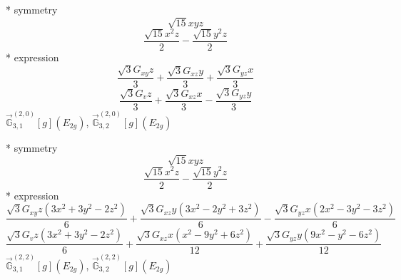 \documentclass[fleqn,8pt]{jsarticle}
\begin{document}
\noindent\quad ** symmetry
\begin{dmath*}
\sqrt{15} x y z
\end{dmath*}
\begin{dmath*}
\frac{\sqrt{15} x^{2} z}{2} - \frac{\sqrt{15} y^{2} z}{2}
\end{dmath*}
\noindent\quad ** expression
\begin{dmath*}
\frac{\sqrt{3} G_{xy} z}{3} + \frac{\sqrt{3} G_{xz} y}{3} + \frac{\sqrt{3} G_{yz} x}{3}
\end{dmath*}
\begin{dmath*}
\frac{\sqrt{3} G_{v} z}{3} + \frac{\sqrt{3} G_{xz} x}{3} - \frac{\sqrt{3} G_{yz} y}{3}
\end{dmath*}
\noindent\quad $\vec{\mathbb{G}}_{3,1}^{(2,0)}[g](E_{2g})$, $\vec{\mathbb{G}}_{3,2}^{(2,0)}[g](E_{2g})$

\noindent\quad ** symmetry
\begin{dmath*}
\sqrt{15} x y z
\end{dmath*}
\begin{dmath*}
\frac{\sqrt{15} x^{2} z}{2} - \frac{\sqrt{15} y^{2} z}{2}
\end{dmath*}
\noindent\quad ** expression
\begin{dmath*}
\frac{\sqrt{3} G_{xy} z \left(3 x^{2} + 3 y^{2} - 2 z^{2}\right)}{6} + \frac{\sqrt{3} G_{xz} y \left(3 x^{2} - 2 y^{2} + 3 z^{2}\right)}{6} - \frac{\sqrt{3} G_{yz} x \left(2 x^{2} - 3 y^{2} - 3 z^{2}\right)}{6}
\end{dmath*}
\begin{dmath*}
\frac{\sqrt{3} G_{v} z \left(3 x^{2} + 3 y^{2} - 2 z^{2}\right)}{6} + \frac{\sqrt{3} G_{xz} x \left(x^{2} - 9 y^{2} + 6 z^{2}\right)}{12} + \frac{\sqrt{3} G_{yz} y \left(9 x^{2} - y^{2} - 6 z^{2}\right)}{12}
\end{dmath*}
\noindent\quad $\vec{\mathbb{G}}_{3,1}^{(2,2)}[g](E_{2g})$, $\vec{\mathbb{G}}_{3,2}^{(2,2)}[g](E_{2g})$
\end{document}
